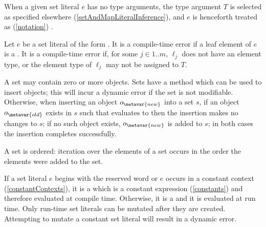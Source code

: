 \documentclass[makeidx]{article}
\begin{document}
{\LMHash{}%
When a given set literal $e$ has no type arguments,
the type argument $T$ is selected as specified elsewhere
(\ref{setAndMapLiteralInference}),
and $e$ is henceforth treated as
(\ref{notation})
.


\LMHash{}%
Let $e$ be a set literal of the form
.
It is a compile-time error if a leaf element of $e$ is a
.
It is a compile-time error if, for some $j \in 1 .. m$,
$\ell_j$ does not have an element type,
or the element type of $\ell_j$ may not be assigned to $T$.

\LMHash{}%
A set may contain zero or more objects.
Sets have a method which can be used to insert objects;
this will incur a dynamic error if the set is not modifiable.
Otherwise, when inserting an object $o_{\metavar{new}}$ into a set $s$,
if an object $o_{\metavar{old}}$ exists in $s$ such that
 evaluates to \TRUE{}
then the insertion makes no changes to $s$;
if no such object exists,
$o_{\metavar{new}}$ is added to $s$;
in both cases the insertion completes successfully.

\LMHash{}%
A set is ordered: iteration over the elements of a set
occurs in the order the elements were added to the set.


\LMHash{}%
If a set literal $e$ begins with the reserved word \CONST{}
or $e$ occurs in a constant context
(\ref{constantContexts}),
it is a
which is a constant expression
(\ref{constants})
and therefore evaluated at compile time.
Otherwise, it is a
and it is evaluated at run time.
Only run-time set literals can be mutated after they are created.
Attempting to mutate a constant set literal will result in a dynamic error.

}
\end{document}
